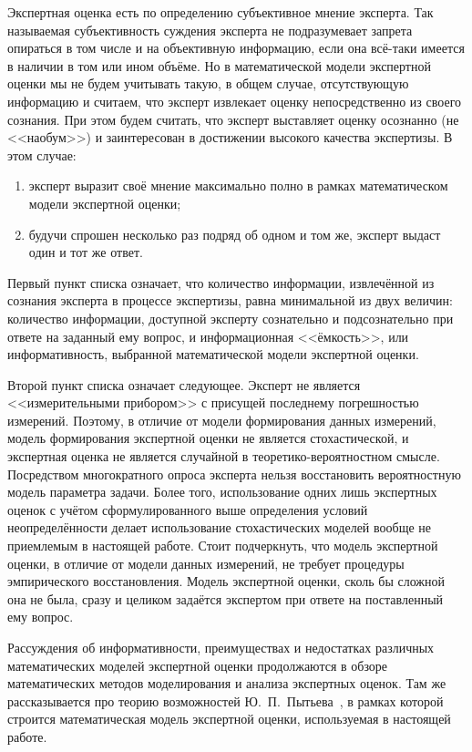 Экспертная оценка есть по определению субъективное мнение эксперта. Так называемая субъективность суждения эксперта не подразумевает запрета опираться в том числе и на объективную информацию, если она всё-таки имеется в наличии в том или ином объёме. Но в математической модели экспертной оценки мы не будем учитывать такую, в общем случае, отсутствующую информацию и считаем, что эксперт извлекает оценку непосредственно из своего сознания. При этом будем считать, что эксперт выставляет оценку осознанно (не <<наобум>>) и заинтересован в достижении высокого качества экспертизы. %
В этом случае:
\begin{enumerate}
 \item эксперт выразит своё мнение максимально полно в рамках математическом модели экспертной оценки;
 \item будучи спрошен несколько раз подряд об одном и том же, эксперт выдаст один и тот же ответ. 
\end{enumerate}

Первый пункт списка означает, что количество информации, извлечённой из сознания эксперта в процессе экспертизы, равна минимальной из двух величин: количество информации, доступной эксперту сознательно и подсознательно при ответе на заданный ему вопрос, и информационная <<ёмкость>>, или информативность, выбранной математической модели экспертной оценки.

Второй пункт списка означает следующее. Эксперт не является <<измерительными прибором>> с присущей последнему погрешностью измерений. Поэтому, в отличие от модели формирования данных измерений, модель формирования экспертной оценки не является стохастической, и экспертная оценка не является случайной в теоретико-вероятностном смысле. Посредством многократного опроса эксперта нельзя восстановить вероятностную модель параметра задачи. Более того, использование одних лишь экспертных оценок с учётом сформулированного выше определения условий неопределённости делает использование стохастических моделей вообще не приемлемым в настоящей работе. Стоит подчеркнуть, что модель экспертной оценки, в отличие от модели данных измерений, не требует процедуры эмпирического восстановления. Модель экспертной оценки, сколь бы сложной она не была, сразу и целиком задаётся экспертом при ответе на поставленный ему вопрос.

Рассуждения об информативности, преимуществах и недостатках различных математических моделей экспертной оценки продолжаются в обзоре математических методов моделирования и анализа экспертных оценок. Там же рассказывается про теорию возможностей Ю.~П.~Пытьева~\cite{possbook}, %
в рамках которой строится математическая модель экспертной оценки, используемая в настоящей работе.  


